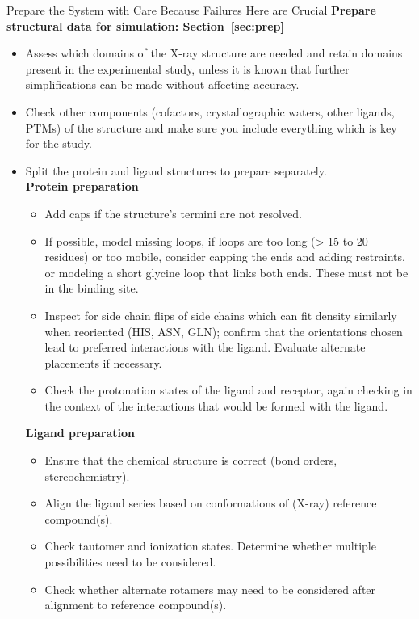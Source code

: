 \documentclass[9pt,bestpractices]{livecoms}
\begin{document}
%
\begin{Checklists*}[hp!]
\begin{checklist}{Prepare the System with Care Because Failures Here are Crucial}
\textbf{Prepare structural data for simulation: Section~\ref{sec:prep}}
    \begin{itemize}
        \item Assess which domains of the X-ray structure are needed and retain domains present in the experimental study, unless it is known that further simplifications can be made without affecting accuracy.
        \item Check other components (cofactors, crystallographic waters, other ligands, PTMs) of the structure and make sure you include everything which is key for the study.
        \item Split the protein and ligand structures to prepare separately.\\
        \textbf{Protein preparation}
    \begin{itemize}
                \item Add caps if the structure's termini are not resolved.
                \item If possible, model missing loops, if loops are too long (> 15 to 20 residues) or too mobile, consider capping the ends and adding restraints, or modeling a short glycine loop that links both ends. These must not be in the binding site.
                \item Inspect for side chain flips of side chains which can fit density similarly when reoriented (HIS, ASN, GLN); confirm that the orientations chosen lead to preferred interactions with the ligand. Evaluate alternate placements if necessary.
                \item Check the protonation states of the ligand and receptor, again checking in the context of the interactions that would be formed with the ligand.
    \end{itemize}
        \textbf{Ligand preparation}
    \begin{itemize}
            \item Ensure that the chemical structure is correct (bond orders, stereochemistry).
            \item Align the ligand series based on conformations of (X-ray) reference compound(s).
            \item Check tautomer and ionization states. Determine whether multiple possibilities need to be considered.
            \item Check whether alternate rotamers may need to be considered after alignment to reference compound(s).

\end{itemize}
\end{itemize}
\end{checklist}
\end{Checklists*}
\end{document}
